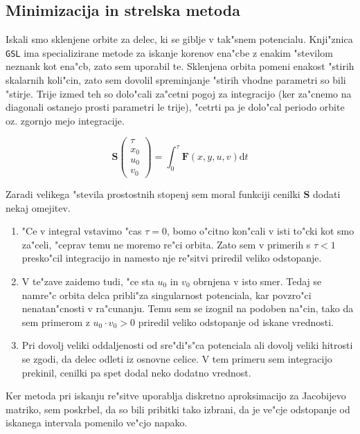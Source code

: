 \documentclass[a4paper,10pt]{article}
\renewcommand{\vec}{\mathbf}
\newcommand{\dd}{\mathrm{d}}
\begin{document}
\subsection{Minimizacija in strelska metoda}

Iskali smo sklenjene orbite za delec, ki se giblje v tak"snem potencialu. Knji"znica \texttt{GSL} ima specializirane metode za iskanje korenov ena"cbe z enakim "stevilom neznank kot ena"cb, zato sem uporabil te. Sklenjena orbita pomeni enakost "stirih skalarnih koli"cin, zato sem dovolil spreminjanje "stirih vhodne parametri so bili "stirje. Trije izmed teh so dolo"cali za"cetni pogoj za integracijo (ker za"cnemo na diagonali ostanejo prosti parametri le trije), "cetrti pa je dolo"cal periodo orbite oz. zgornjo mejo integracije. 

\begin{equation}
 \vec S\left(\begin{matrix}\tau \\ x_0 \\ u_0 \\ v_0\end{matrix}\right) = \int_0^\tau \vec F(x,y,u,v) \dd t 
\end{equation}

Zaradi velikega "stevila prostostnih stopenj sem moral funkciji cenilki $\vec S$ dodati nekaj omejitev. 

\begin{enumerate}
 \item "Ce v integral vstavimo "cas $\tau=0$, bomo o"citno kon"cali v isti to"cki kot smo za"celi, "ceprav temu ne moremo re"ci orbita. Zato sem v primerih s $\tau < 1$ presko"cil integracijo in namesto nje re"sitvi priredil veliko odstopanje. 
 \item V te"zave zaidemo tudi, "ce sta $u_0$ in $v_0$ obrnjena v isto smer. Tedaj se namre"c orbita delca pribli"za singularnost potenciala, kar povzro"ci nenatan"cnosti v ra"cunanju. Temu sem se izognil na podoben na"cin, tako da sem primerom z $u_0 \cdot v_0 > 0$ priredil veliko odstopanje od iskane vrednosti. 
 \item Pri dovolj veliki oddaljenosti od sre"di"s"ca potenciala ali dovolj veliki hitrosti se zgodi, da delec odleti iz osnovne celice. V tem primeru sem integracijo prekinil, cenilki pa spet dodal neko dodatno vrednost. 
\end{enumerate}

Ker metoda pri iskanju re"sitve uporablja diskretno aproksimacijo za Jacobijevo matriko, sem poskrbel, da so bili pribitki tako izbrani, da je ve"cje odstopanje od iskanega intervala pomenilo ve"cjo napako. 
\end{document}
